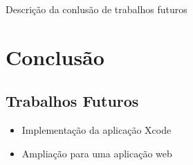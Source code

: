 Descrição da conlusão de trabalhos futuros

\section{Conclusão}

\subsection{Trabalhos Futuros}

\begin{itemize}
 \item Implementação da aplicação Xcode
 \item Ampliação para uma aplicação web
\end{itemize}
